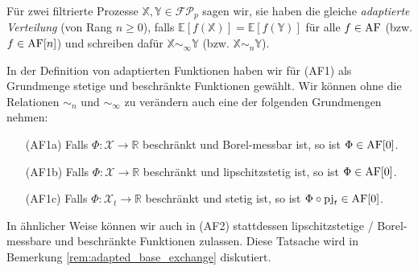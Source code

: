 \begin{definition}
Für zwei filtrierte Prozesse $\mathbb{X,Y} \in \mathcal{FP}_p$ sagen wir, sie haben die gleiche \emph{adaptierte Verteilung} (von Rang $n\geq 0$), falls $\mathbb{E}[f(\mathbb{X})] = \mathbb{E}[f(\mathbb{Y})]$ für alle $f \in \operatorname{AF}$ (bzw. $f \in \operatorname{AF}[n]$) und schreiben dafür $\mathbb{X} \sim_\infty \mathbb{Y}$ (bzw. $\mathbb{X} \sim_n \mathbb{Y}$).
\end{definition}

\begin{remark}\label{thm:adapted_functions_base_change}
    In der Definition von adaptierten Funktionen haben wir für (AF1) als Grundmenge stetige und beschränkte Funktionen gewählt. Wir können ohne die Relationen $\sim_n$ und $\sim_\infty$ zu verändern auch eine der folgenden Grundmengen nehmen:
    \begin{itemize}
        \item[(AF1a)] Falls $\Phi: \mathcal{X}\rightarrow \mathbb{R}$ beschränkt und Borel-messbar ist, so ist $\Phi \in \operatorname{AF}[0]$.
        \item[(AF1b)] Falls $\Phi: \mathcal{X}\rightarrow \mathbb{R}$ beschränkt und lipschitzstetig ist, so ist $\Phi \in \operatorname{AF}[0]$.
        \item[(AF1c)] Falls $\Phi: \mathcal{X}_t\rightarrow \mathbb{R}$ beschränkt und stetig ist, so ist $\Phi \circ \operatorname{pj}_t \in \operatorname{AF}[0]$.
    \end{itemize}
    In ähnlicher Weise können wir auch in (AF2) stattdessen lipschitzstetige / Borel-messbare und beschränkte Funktionen zulassen. Diese Tatsache wird in Bemerkung \ref{rem:adapted_base_exchange} diskutiert.
\end{remark}

